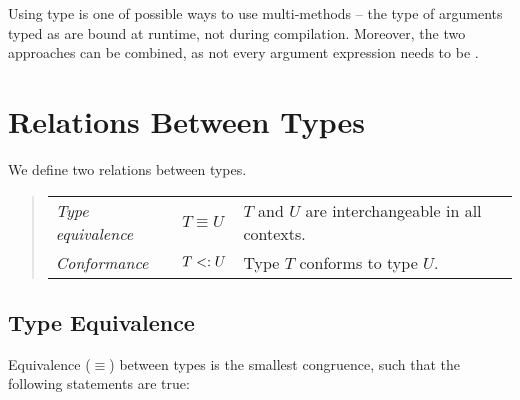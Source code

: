 Using  type is one of possible ways to use multi-methods -- the type of arguments typed as  are bound at runtime, not during compilation. Moreover, the two approaches can be combined, as not every argument expression needs to be .





\section{Relations Between Types}

We define two relations between types. 
\begin{quote}\begin{tabular}{l@{\gap}l@{\gap}l}
\em Type equivalence & $T \equiv U$ & $T$ and $U$ are interchangeable
in all contexts.
\\
\em Conformance & $T <: U$ & Type $T$ conforms to type $U$.
\end{tabular}\end{quote}






\subsection{Type Equivalence}

Equivalence ($\equiv$) between types is the smallest congruence, such that the following statements are true:

